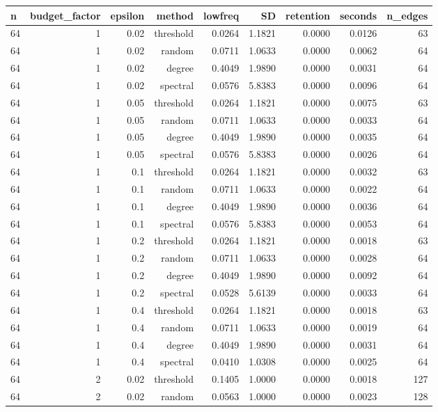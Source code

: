 \begin{table}[t]
\centering
\begin{tabular}{lrrrrrrrr}
\hline
n & budget\_factor & epsilon & method & lowfreq & SD & retention & seconds & n\_edges \\
\hline
64 & 1 & 0.02 & threshold & 0.0264 & 1.1821 & 0.0000 & 0.0126 & 63 \\
64 & 1 & 0.02 & random & 0.0711 & 1.0633 & 0.0000 & 0.0062 & 64 \\
64 & 1 & 0.02 & degree & 0.4049 & 1.9890 & 0.0000 & 0.0031 & 64 \\
64 & 1 & 0.02 & spectral & 0.0576 & 5.8383 & 0.0000 & 0.0096 & 64 \\
64 & 1 & 0.05 & threshold & 0.0264 & 1.1821 & 0.0000 & 0.0075 & 63 \\
64 & 1 & 0.05 & random & 0.0711 & 1.0633 & 0.0000 & 0.0033 & 64 \\
64 & 1 & 0.05 & degree & 0.4049 & 1.9890 & 0.0000 & 0.0035 & 64 \\
64 & 1 & 0.05 & spectral & 0.0576 & 5.8383 & 0.0000 & 0.0026 & 64 \\
64 & 1 & 0.1 & threshold & 0.0264 & 1.1821 & 0.0000 & 0.0032 & 63 \\
64 & 1 & 0.1 & random & 0.0711 & 1.0633 & 0.0000 & 0.0022 & 64 \\
64 & 1 & 0.1 & degree & 0.4049 & 1.9890 & 0.0000 & 0.0036 & 64 \\
64 & 1 & 0.1 & spectral & 0.0576 & 5.8383 & 0.0000 & 0.0053 & 64 \\
64 & 1 & 0.2 & threshold & 0.0264 & 1.1821 & 0.0000 & 0.0018 & 63 \\
64 & 1 & 0.2 & random & 0.0711 & 1.0633 & 0.0000 & 0.0028 & 64 \\
64 & 1 & 0.2 & degree & 0.4049 & 1.9890 & 0.0000 & 0.0092 & 64 \\
64 & 1 & 0.2 & spectral & 0.0528 & 5.6139 & 0.0000 & 0.0033 & 64 \\
64 & 1 & 0.4 & threshold & 0.0264 & 1.1821 & 0.0000 & 0.0018 & 63 \\
64 & 1 & 0.4 & random & 0.0711 & 1.0633 & 0.0000 & 0.0019 & 64 \\
64 & 1 & 0.4 & degree & 0.4049 & 1.9890 & 0.0000 & 0.0031 & 64 \\
64 & 1 & 0.4 & spectral & 0.0410 & 1.0308 & 0.0000 & 0.0025 & 64 \\
64 & 2 & 0.02 & threshold & 0.1405 & 1.0000 & 0.0000 & 0.0018 & 127 \\
64 & 2 & 0.02 & random & 0.0563 & 1.0000 & 0.0000 & 0.0023 & 128 \\

\end{tabular}
\end{table}
